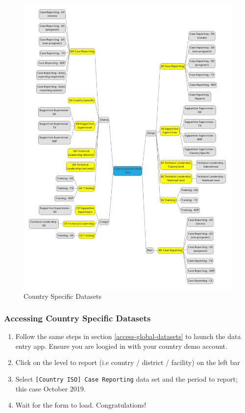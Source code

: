 \documentclass[]{book}
\begin{document}
\begin{figure}
\includegraphics[width=18.6in]{./images/pmp datasets} \caption{Country Specific Datasets}\label{fig:pmp-datasets}
\end{figure}

\hypertarget{accessing-country-specific-datasets}{%
\subsubsection{Accessing Country Specific Datasets}\label{accessing-country-specific-datasets}}

\begin{enumerate}
\def\labelenumi{\arabic{enumi}.}
\item
  Follow the same steps in section \ref{access-global-datasets} to launch the data entry app. Ensure you are loogied in with your country demo account.
\item
  Click on the level to report (i.e country / district / facility) on the left bar
\item
  Select \texttt{{[}Country\ ISO{]}\ Case\ Reporting} data set and the period to report; this case October 2019.
\item
  Wait for the form to load. Congratulations!
\end{enumerate}
\end{document}
